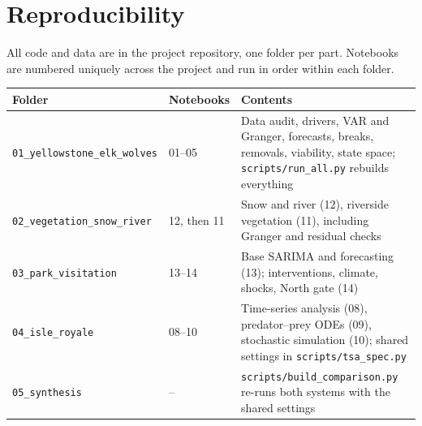 \documentclass[11pt,a4paper]{article}
\begin{document}
\section{Reproducibility}
All code and data are in the project repository, one folder per part. Notebooks are numbered uniquely across the project and run in order within each folder.
\begin{table}[H]
\centering\small
\begin{tabularx}{\textwidth}{@{}l l Y@{}}
\toprule
Folder & Notebooks & Contents \\
\midrule
\texttt{01\_yellowstone\_elk\_wolves} & 01--05 & Data audit, drivers, VAR and Granger, forecasts, breaks, removals, viability, state space; \texttt{scripts/run\_all.py} rebuilds everything \\
\texttt{02\_vegetation\_snow\_river} & 12, then 11 & Snow and river (12), riverside vegetation (11), including Granger and residual checks \\
\texttt{03\_park\_visitation} & 13--14 & Base SARIMA and forecasting (13); interventions, climate, shocks, North gate (14) \\
\texttt{04\_isle\_royale} & 08--10 & Time-series analysis (08), predator--prey ODEs (09), stochastic simulation (10); shared settings in \texttt{scripts/tsa\_spec.py} \\
\texttt{05\_synthesis} & -- & \texttt{scripts/build\_comparison.py} re-runs both systems with the shared settings \\
\bottomrule
\end{tabularx}
\end{table}
\end{document}

